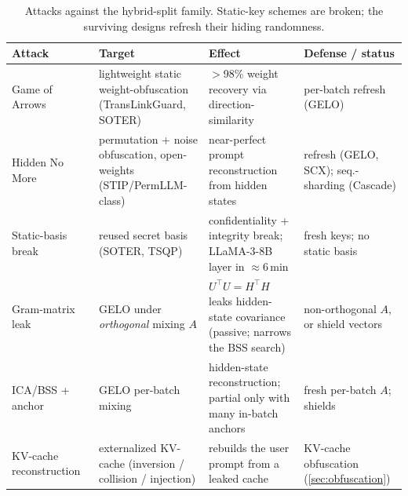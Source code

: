 \begin{table}[b!]
\centering
\caption{Attacks against the hybrid-split family. Static-key schemes are broken;
the surviving designs refresh their hiding randomness.}
\label{tab:hybrid-attacks}
\footnotesize
\setlength{\tabcolsep}{5pt}
\renewcommand{\arraystretch}{1.15}
\begin{tabularx}{\textwidth}{@{}Y{0.62}Y{1.28}Y{1.3}Y{0.8}@{}}
\toprule
\textbf{Attack} & \textbf{Target} & \textbf{Effect} & \textbf{Defense / status} \\
\midrule
Game of Arrows~\citep{arrowmatch} & lightweight static weight-obfuscation (TransLinkGuard, SOTER) & $>$98\% weight recovery via direction-similarity & per-batch refresh (GELO) \\
\addlinespace[3pt]
Hidden No More~\citep{hnm} & permutation + noise obfuscation, open-weights (STIP/PermLLM-class) & near-perfect prompt reconstruction from hidden states & refresh (GELO, SCX); seq.-sharding (Cascade) \\
\addlinespace[3pt]
Static-basis break~\citep{saini_precomp_break} & reused secret basis (SOTER, TSQP) & confidentiality + integrity break; LLaMA-3-8B layer in ${\approx}6$\,min & fresh keys; no static basis \\
\addlinespace[3pt]
Gram-matrix leak~\citep{belikov_gelo} & GELO under \emph{orthogonal} mixing $A$ & $U^{\top}U{=}H^{\top}H$ leaks hidden-state covariance (passive; narrows the BSS search) & non-orthogonal $A$, or shield vectors \\
\addlinespace[3pt]
ICA/BSS + anchor~\citep{hyvarinen_ica,cardoso_jade,belikov_gelo} & GELO per-batch mixing & hidden-state reconstruction; partial only with many in-batch anchors & fresh per-batch $A$; shields \\
\addlinespace[3pt]
KV-cache reconstruction~\citep{luo_shadowcache} & externalized KV-cache (inversion / collision / injection) & rebuilds the user prompt from a leaked cache & KV-cache obfuscation (\cref{sec:obfuscation}) \\
\bottomrule
\end{tabularx}
\end{table}

